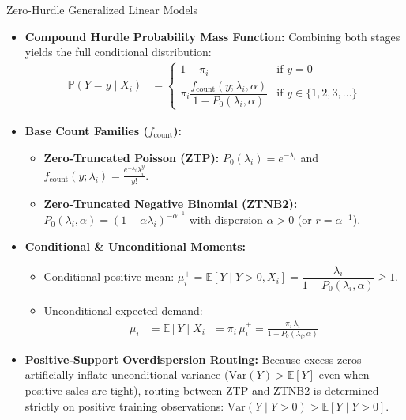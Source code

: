\documentclass[11pt]{beamer}
\begin{document}
\begin{frame}[allowframebreaks]{Zero-Hurdle Generalized Linear Models}
\framebreak
\begin{small}
\begin{itemize}
\item \textbf{Compound Hurdle Probability Mass Function:} Combining both stages yields the full conditional distribution:
\begin{align*}
\mathbb{P}(Y = y \mid X_i) &= \begin{cases}
1 - \pi_i & \text{if } y = 0 \\[6pt]
\pi_i \dfrac{f_{\text{count}}(y; \lambda_i, \alpha)}{1 - P_0(\lambda_i, \alpha)} & \text{if } y \in \{1, 2, 3, \dots\}
\end{cases}
\end{align*}
\item \textbf{Base Count Families ($f_{\text{count}}$):}
\begin{itemize}
\item \textbf{Zero-Truncated Poisson (ZTP):} $P_0(\lambda_i) = e^{-\lambda_i}$ and $f_{\text{count}}(y; \lambda_i) = \frac{e^{-\lambda_i}\lambda_i^y}{y!}$.
\item \textbf{Zero-Truncated Negative Binomial (ZTNB2):} $P_0(\lambda_i, \alpha) = (1 + \alpha \lambda_i)^{-\alpha^{-1}}$ with dispersion $\alpha > 0$ (or $r = \alpha^{-1}$).
\end{itemize}
\item \textbf{Conditional \& Unconditional Moments:}
\begin{itemize}
\item Conditional positive mean: $\mu_i^{+} = \mathbb{E}[Y \mid Y > 0, X_i] = \dfrac{\lambda_i}{1 - P_0(\lambda_i, \alpha)} \geq 1$.
\item Unconditional expected demand:
\begin{align*}
\mu_i &= \mathbb{E}[Y \mid X_i] = \pi_i \, \mu_i^{+} = \frac{\pi_i \, \lambda_i}{1 - P_0(\lambda_i, \alpha)}
\end{align*}
\end{itemize}
\item \textbf{Positive-Support Overdispersion Routing:} Because excess zeros artificially inflate unconditional variance ($\text{Var}(Y) > \mathbb{E}[Y]$ even when positive sales are tight), routing between ZTP and ZTNB2 is determined strictly on positive training observations: $\text{Var}(Y \mid Y > 0) > \mathbb{E}[Y \mid Y > 0]$.
\end{itemize}
\end{small}


\end{frame}
\end{document}
